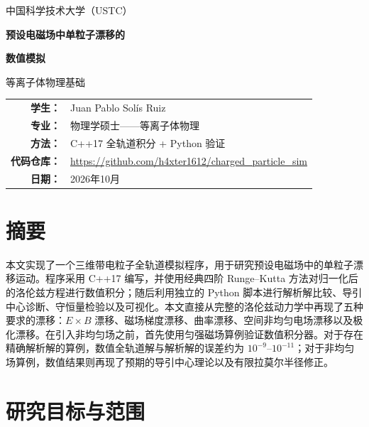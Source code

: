 \documentclass[UTF8,11pt,a4paper]{ctexart}
\begin{document}
\begin{titlepage}
    \centering
    \vspace*{2.0cm}

    {\Large 中国科学技术大学（USTC）\par}
    \vspace{1.1cm}

    {\huge\bfseries 预设电磁场中单粒子漂移的\par}
    \vspace{0.25cm}
    {\huge\bfseries 数值模拟\par}

    \vspace{1.4cm}
    {\Large 等离子体物理基础\par}

    \vfill

    \begin{tabular}{rl}
        \textbf{学生：} & Juan Pablo Solís Ruiz \\
        \textbf{专业：} & 物理学硕士——等离子体物理 \\
        \textbf{方法：} & C++17 全轨道积分 + Python 验证 \\
	\textbf{代码仓库：} & \url{https://github.com/h4xter1612/charged_particle_sim} \\
        \textbf{日期：} & 2026年10月
    \end{tabular}

    \vfill
\end{titlepage}

\section*{摘要}
本文实现了一个三维带电粒子全轨道模拟程序，用于研究预设电磁场中的单粒子漂移运动。程序采用 C++17 编写，并使用经典四阶 Runge--Kutta 方法对归一化后的洛伦兹方程进行数值积分；随后利用独立的 Python 脚本进行解析解比较、导引中心诊断、守恒量检验以及可视化。本文直接从完整的洛伦兹动力学中再现了五种要求的漂移：$E\times B$ 漂移、磁场梯度漂移、曲率漂移、空间非均匀电场漂移以及极化漂移。在引入非均匀场之前，首先使用匀强磁场算例验证数值积分器。对于存在精确解析解的算例，数值全轨道解与解析解的误差约为 $10^{-9}$--$10^{-11}$；对于非均匀场算例，数值结果则再现了预期的导引中心理论以及有限拉莫尔半径修正。

\tableofcontents
\newpage

\section{研究目标与范围}
\end{document}
